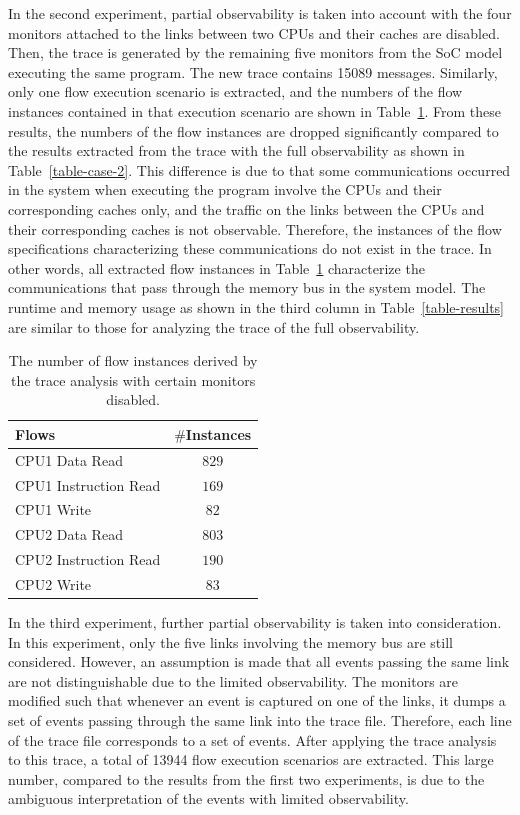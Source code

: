 \documentclass[12pt,frontmatter,copyright,thesis]{usfmanus}
\begin{document}
In the second experiment, partial observability is taken into account
with the four monitors attached to the links between two CPUs and their
caches are disabled. Then, the trace is generated by the
remaining five monitors from the SoC model executing the
same program.  The new trace contains 15089 messages.  
Similarly, only one flow execution
scenario is extracted, and the numbers of the
flow instances contained in that execution scenario are
shown in Table~\ref{table-par-obs}.  From these results, the
numbers of the flow instances are dropped significantly
compared to the results extracted from the trace with the
full observability as shown in
Table~\ref{table-case-2}. This difference is due to that
some communications occurred in the system when executing
the program involve the CPUs and their corresponding caches
only, and the traffic on the links between the CPUs and
their corresponding caches is not observable. Therefore, the
instances of the flow specifications characterizing these
communications do not exist in the trace. In other words,
all extracted flow instances in Table~\ref{table-par-obs}
characterize the communications that pass through the memory
bus in the system model.  The runtime and memory usage as shown in
the third column in Table~\ref{table-results} are
similar to those for analyzing the trace of the full
observability.

\begin{table}[tb]
\caption{The number of flow instances derived by the trace analysis with certain monitors disabled.}
\begin{center}
\begin{tabular}{|l|c|}
\hline
Flows & $\#$Instances \\
\hline
\hline
CPU1 Data Read			&  $829$\\
CPU1 Instruction Read		&  $169$\\
CPU1 Write				&  $82$\\
\hline
CPU2 Data Read			&  $803$\\
CPU2 Instruction Read		&  $190$\\
CPU2 Write				&  $83$\\
\hline
\end{tabular}
\end{center}
\label{table-par-obs}
\end{table}%

In the third experiment, further partial observability is taken into consideration.  In this experiment, only the five links involving the memory bus are still considered.  However, an assumption is made that all events passing the same link are not distinguishable due to the limited observability.  The monitors are modified such that whenever an event is captured on one of the links, it dumps a set of events passing through the same link into the trace file.  Therefore, each line of the trace file corresponds to a set of events.  After applying the trace analysis to this trace,  a total of 13944 flow execution scenarios are extracted.    This large number, compared to the results from the first two experiments, is due to the ambiguous interpretation of the events with limited observability.  
\end{document}
